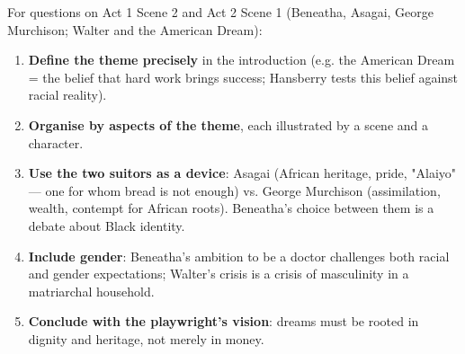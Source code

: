 \documentclass[11pt]{article}
\begin{document}
\begin{methode}
For questions on Act 1 Scene 2 and Act 2 Scene 1 (Beneatha, Asagai, George Murchison; Walter and the American Dream):
\begin{enumerate}
\item \textbf{Define the theme precisely} in the introduction (e.g. the American Dream = the belief that hard work brings success; Hansberry tests this belief against racial reality).
\item \textbf{Organise by aspects of the theme}, each illustrated by a scene and a character.
\item \textbf{Use the two suitors as a device}: Asagai (African heritage, pride, "Alaiyo" — one for whom bread is not enough) vs. George Murchison (assimilation, wealth, contempt for African roots). Beneatha's choice between them is a debate about Black identity.
\item \textbf{Include gender}: Beneatha's ambition to be a doctor challenges both racial and gender expectations; Walter's crisis is a crisis of masculinity in a matriarchal household.
\item \textbf{Conclude with the playwright's vision}: dreams must be rooted in dignity and heritage, not merely in money.
\end{enumerate}
\end{methode}
\end{document}
